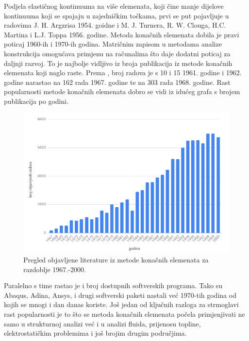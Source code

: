 \documentclass[a4paper,twoside,12pt]{memoir} %
\begin{document}
Podjela elastičnog kontinuuma na više elemenata, koji čine manje dijelove kontinuuma koji se spajaju u zajedničkim točkama, prvi se put pojavljuje u radovima J. H. Argzrisa 1954. goidne i M. J. Turnera, R. W. Clouga, H.C. Martina i L.J. Toppa 1956. godine. Metoda konačnih elemenata dobila je pravi poticaj 1960-ih i 1970-ih godina. Matričnim zapisom u metodama analize konstrukcija omogućava primjenu na računalima što daje dodatni poticaj za daljnji razvoj. To je najbolje vidljivo iz broja publikacija iz metode konačnih elemenata koji naglo raste. Prema \cite{jurica_soric_117}, broj radova je s 10 i 15 1961. godine i 1962. godine narastao na 162 rada 1967. godine te na 303 rada 1968. godine. Rast popularnosti metode konačnih elemenata dobro se vidi iz idućeg grafa s brojem publikacija po godini.
\begin{figure}[h!t]
\begin{center}
\includegraphics[scale=0.5]{pictures/chapter_fem/broj_objavljenih_radova.png}
\caption{Pregled objavljene literature iz metode konačnih elemenata za razdoblje 1967.-2000. \cite{jurica_soric_76}}
\end{center}
\end{figure}
Paralelno s time rastao je i broj dostupnih softverskih programa. Tako su Abaqus, Adina, Ansys, i drugi softverski paketi nastali već 1970-tih godina od kojih se mnogi i dan danas koriste. Još jedan od ključnih razloga za strmoglavi rast popularnosti je to što se metoda konačnih elemenata počela primjenjivati ne samo u strukturnoj analizi već i u analizi fluida, prijenosu topline, elektrostatičkim problemima i još brojim drugim područjima. \par
\end{document}
